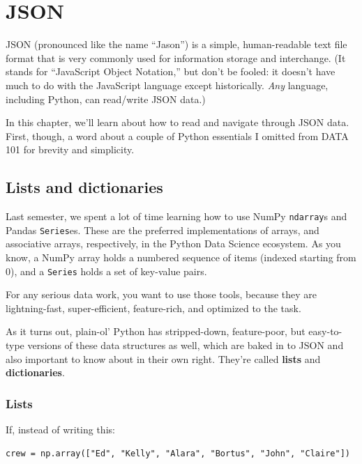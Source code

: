 
\chapter{JSON}
\label{ch:JSON}

JSON (pronounced like the name ``Jason'') is a simple, human-readable text file
format that is very commonly used for information storage and interchange. (It
stands for ``JavaScript Object Notation,'' but don't be fooled: it doesn't have
much to do with the JavaScript language except historically. \textit{Any}
language, including Python, can read/write JSON data.)

In this chapter, we'll learn about how to read and navigate through JSON data.
First, though, a word about a couple of Python essentials I omitted from DATA
101 for brevity and simplicity.

\section{Lists and dictionaries}


Last semester, we spent a lot of time learning how to use NumPy
\texttt{ndarray}s and Pandas \texttt{Series}es. These are the preferred
implementations of arrays, and associative arrays, respectively, in the Python
Data Science ecosystem. As you know, a NumPy array holds a numbered sequence of
items (indexed starting from 0), and a \texttt{Series} holds a set of key-value
pairs.

For any serious data work, you want to use those tools, because they are
lightning-fast, super-efficient, feature-rich, and optimized to the task.


As it turns out, plain-ol' Python has stripped-down, feature-poor, but
easy-to-type versions of these data structures as well, which are baked in to
JSON and also important to know about in their own right. They're called
\textbf{lists} and \textbf{dictionaries}.

\subsection{Lists}

If, instead of writing this:

\begin{Verbatim}[fontsize=\small,samepage=true,frame=single,framesep=3mm]
crew = np.array(["Ed", "Kelly", "Alara", "Bortus", "John", "Claire"])
\end{Verbatim}

